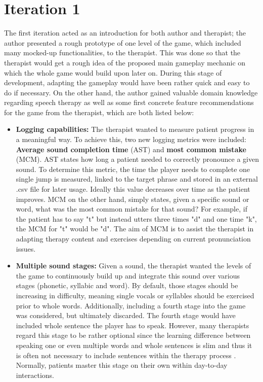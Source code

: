\documentclass[draft,final]{vutinfth} %
\begin{document}
\section{Iteration 1}
The first iteration acted as an introduction for both author and therapist; the author presented a rough prototype of one level of the game, which included many mocked-up functionalities, to the therapist. This was done so that the therapist would get a rough idea of the proposed main gameplay mechanic on which the whole game would build upon later on. During this stage of development, adapting the gameplay would have been rather quick and easy to do if necessary. On the other hand, the author gained valuable domain knowledge regarding speech therapy as well as some first concrete feature recommendations for the game from the therapist, which are both listed below:
\begin{itemize}
\item \textbf{Logging capabilities:} The therapist wanted to measure patient progress in a meaningful way. To achieve this, two new logging metrics were included: \textbf{Average sound completion time} (AST) and \textbf{most common mistake} (MCM). AST states how long a patient needed to correctly pronounce a given sound. To determine this metric, the time the player needs to complete one single jump is measured, linked to the target phrase and stored in an external .csv file for later usage. Ideally this value decreases over time as the patient improves. MCM on the other hand, simply states, given a specific sound or word, what was the most common mistake for that sound? For example, if the patient has to say "t" but instead utters three times "d" and one time "k", the MCM for "t" would be "d". The aim of MCM is to assist the therapist in adapting therapy content and exercises depending on current pronunciation issues.

\item \textbf{Multiple sound stages:} Given a sound, the therapist wanted the levels of the game to continuously build up and integrate this sound over various stages  (phonetic, syllabic and word). By default, those stages should be increasing in difficulty, meaning single vocals or syllables should be exercised prior to whole words. Additionally, including a fourth stage into the game was considered, but ultimately discarded. The fourth stage would have included whole sentence the player has to speak. However, many therapists regard this stage to be rather optional since the learning difference between speaking one or even multiple words and whole sentences is slim and thus it is often not necessary to include sentences within the therapy process \cite{proestler2023}. Normally, patients master this stage on their own within day-to-day interactions.


\end{itemize}
\end{document}
